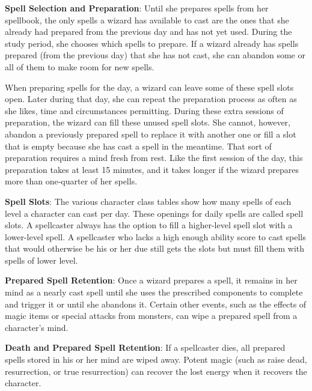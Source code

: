 \textbf{Spell Selection and Preparation}: Until she prepares spells from her spellbook, the only spells a wizard has available to cast are the ones that she already had prepared from the previous day and has not yet used. During the study period, she chooses which spells to prepare. If a wizard already has spells prepared (from the previous day) that she has not cast, she can abandon some or all of them to make room for new spells.

When preparing spells for the day, a wizard can leave some of these spell slots open. Later during that day, she can repeat the preparation process as often as she likes, time and circumstances permitting. During these extra sessions of preparation, the wizard can fill these unused spell slots. She cannot, however, abandon a previously prepared spell to replace it with another one or fill a slot that is empty because she has cast a spell in the meantime. That sort of preparation requires a mind fresh from rest. Like the first session of the day, this preparation takes at least 15 minutes, and it takes longer if the wizard prepares more than one-quarter of her spells.

\textbf{Spell Slots}: The various character class tables show how many spells of each level a character can cast per day. These openings for daily spells are called spell slots. A spellcaster always has the option to fill a higher-level spell slot with a lower-level spell. A spellcaster who lacks a high enough ability score to cast spells that would otherwise be his or her due still gets the slots but must fill them with spells of lower level.

\textbf{Prepared Spell Retention}: Once a wizard prepares a spell, it remains in her mind as a nearly cast spell until she uses the prescribed components to complete and trigger it or until she abandons it. Certain other events, such as the effects of magic items or special attacks from monsters, can wipe a prepared spell from a character's mind.

\textbf{Death and Prepared Spell Retention}: If a spellcaster dies, all prepared spells stored in his or her mind are wiped away. Potent magic (such as raise dead, resurrection, or true resurrection) can recover the lost energy when it recovers the character.